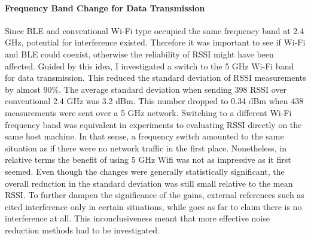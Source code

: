 \documentclass[a4paper, oneside]{ipsreport}
\begin{document}
\paragraph{Frequency Band Change for Data Transmission}
Since BLE and conventional Wi-Fi type occupied the same frequency band at 2.4 GHz, potential for interference existed. Therefore it was important to see if Wi-Fi and BLE could coexist, otherwise the reliability of RSSI might have been affected. Guided by this idea, I investigated a switch to the 5 GHz Wi-Fi band for data transmission. This reduced the standard deviation of RSSI measurements by almost 90\%. The average standard deviation when sending 398 RSSI over conventional 2.4 GHz was 3.2 dBm. This number dropped to 0.34 dBm when 438 measurements were sent over a 5 GHz network. Switching to a different Wi-Fi frequency band was equivalent in experiments to evaluating RSSI directly on the same host machine. In that sense, a frequency switch amounted to the same situation as if there were no network traffic in the first place. Nonetheless, in relative terms the benefit of using 5 GHz Wifi was not as impressive as it first seemed. Even though the changes were generally statistically significant, the overall reduction in the standard deviation was still small relative to the mean RSSI. To further dampen the significance of the gains, external references such as \autocite{WifiBluetoothInterferenceMathworks, WifiBluetoothInterferenceApple} cited interference only in certain situations, while \autocite{BLEWifiCoexistence} goes as far to claim there is no interference at all. This inconclusiveness meant that more effective noise reduction methods had to be investigated.
\end{document}
